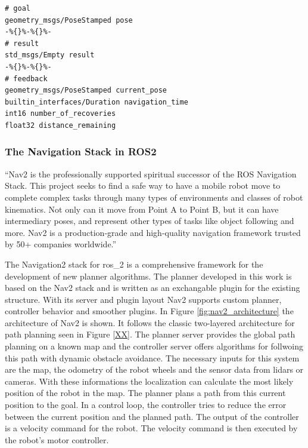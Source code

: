 \begin{lstlisting}
# goal
geometry_msgs/PoseStamped pose
-%{}%-%{}%-
# result
std_msgs/Empty result
-%{}%-%{}%-
# feedback
geometry_msgs/PoseStamped current_pose
builtin_interfaces/Duration navigation_time
int16 number_of_recoveries
float32 distance_remaining
\end{lstlisting}
    
\subsubsection{The Navigation Stack in ROS2}

\begin{displayquote}
    \enquote{Nav2 is the professionally supported spiritual successor of the ROS Navigation Stack. This project seeks to find a safe way to have a mobile robot move to complete complex tasks through many types of environments and classes of robot kinematics. Not only can it move from Point A to Point B, but it can have intermediary poses, and represent other types of tasks like object following and more. Nav2 is a production-grade and high-quality navigation framework trusted by 50+ companies worldwide.} \cite{https://navigation.ros.org/}
\end{displayquote}

The Navigation2 stack for \gls{ros_2} is a comprehensive framework for the development of new planner algorithms. The planner developed in this work is based on the Nav2 stack and is written as an exchangable plugin for the existing structure. With its server and plugin layout Nav2 supports custom planner, controller behavior and smoother plugins. In Figure \ref{fig:nav2_architecture} the architecture of Nav2 is shown. It follows the classic two-layered architecture for path planning seen in Figure \ref{XX}. The planner server provides the global path planning on a known map and the controller server offers algorithms for follwoing this path with dynamic obstacle avoidance. The necessary inputs for this system are the map, the odometry of the robot wheels and the sensor data from lidars or cameras. With these informations the localization can calculate the most likely position of the robot in the map. The planner plans a path from this current position to the goal. In a control loop, the controller tries to reduce the error between the current position and the planned path. The output of the controller is a velocity command for the robot. The velocity command is then executed by the robot's motor controller.


